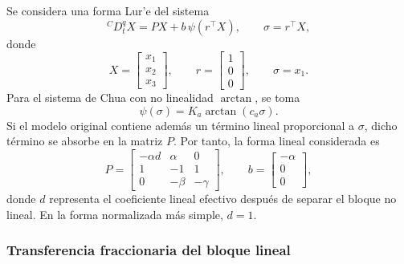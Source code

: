 \documentclass[journal]{IEEEtran}
\begin{document}
Se considera una forma Lur'e del sistema
\begin{equation}
\label{eq:chua_arctan_lure_general}
{}^C D_t^q X
=
PX+b\,\psi(r^\top X),
\qquad
\sigma=r^\top X,
\end{equation}
donde
\[
X=
\begin{bmatrix}
x_1\\x_2\\x_3
\end{bmatrix},
\qquad
r=
\begin{bmatrix}
1\\0\\0
\end{bmatrix},
\qquad
\sigma=x_1.
\]
Para el sistema de Chua con no linealidad \(\arctan\), se toma
\begin{equation}
\label{eq:psi_arctan_general}
\psi(\sigma)
=
K_a\arctan(c_a\sigma).
\end{equation}
Si el modelo original contiene además un término lineal proporcional a
\(\sigma\), dicho término se absorbe en la matriz \(P\). Por tanto, la
forma lineal considerada es
\begin{equation}
\label{eq:P_arctan_general}
P=
\begin{bmatrix}
-\alpha d & \alpha & 0\\
1 & -1 & 1\\
0 & -\beta & -\gamma
\end{bmatrix},
\qquad
b=
\begin{bmatrix}
-\alpha\\0\\0
\end{bmatrix},
\end{equation}
donde \(d\) representa el coeficiente lineal efectivo después de separar el
bloque no lineal. En la forma normalizada más simple, \(d=1\).

\subsubsection{Transferencia fraccionaria del bloque lineal}
\end{document}
